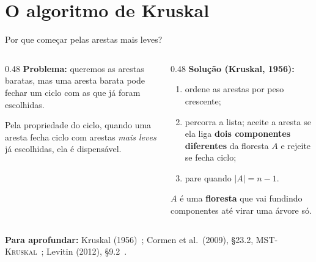 \documentclass[aspectratio=169,xcolor=table]{beamer}
\newcommand{\fonte}[1]{%
  \vfill
  {\tiny\color{gray!55!black}\textbf{Para aprofundar:} #1\par}%
}
\begin{document}
\section{O algoritmo de Kruskal}

\begin{frame}{Por que começar pelas arestas mais leves?}
  \begin{columns}[T]
    \begin{column}{0.48\textwidth}
      \textbf{Problema:} queremos as arestas baratas, mas uma aresta barata pode fechar um
      ciclo com as que já foram escolhidas.
      \medskip

      {\small Pela propriedade do ciclo, quando uma aresta fecha ciclo com arestas
      \emph{mais leves} já escolhidas, ela é dispensável.}
    \end{column}
    \begin{column}{0.48\textwidth}
      \textbf{Solução (Kruskal, 1956):}
      \begin{enumerate}
        \small
        \item ordene as arestas por peso crescente;
        \item percorra a lista; aceite a aresta se ela liga \textbf{dois componentes
              diferentes} da floresta $A$ e rejeite se fecha ciclo;
        \item pare quando $|A| = n - 1$.
      \end{enumerate}
      {\small $A$ é uma \textbf{floresta} que vai fundindo componentes até virar uma árvore só.}
    \end{column}
  \end{columns}
  \fonte{Kruskal (1956)~\cite{kruskal1956shortest}; Cormen et al.\ (2009), \S 23.2,
    \textsc{MST-Kruskal}~\cite{cormen2009introduction}; Levitin (2012),
    \S 9.2~\cite{levitin2012introduction}.}
\end{frame}
\end{document}
